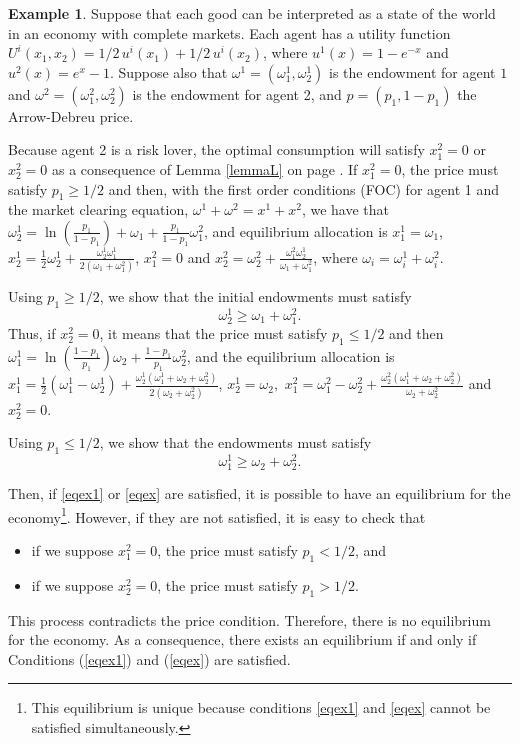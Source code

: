 \documentclass[pdftex]{article}
\numberwithin{equation}{section}
\theoremstyle{th}
\newtheorem{proof lemma}{{Proof Lemma}.}
\theoremstyle{definition}
\newtheorem{example}{Example}%
\newtheorem*{risk lovers}{Risk lovers}
\newtheorem*{risk averse}{Risk averse}
\begin{document}
\begin{example}
\label{ex-1}
Suppose that each good can be interpreted as a state of the world in an economy with complete markets. Each agent has a utility function $U^i\left(x_1,x_2\right)=1/2\,u^i\left(x_1\right)+1/2\,u^i(x_2)$, where $u^1(x)=1-e^{-x}$ and $u^2(x)=e^x-1$. Suppose also that $\omega^1=\left(\omega^1_1,\omega_2^1\right)$ is the endowment for agent $1$ and $\omega^2=\left(\omega^2_1,\omega^2_2\right)$ is the endowment for agent 2, and $p=(p_1,1-p_1)$ the Arrow-Debreu price.

Because agent 2 is a risk lover, the optimal consumption will satisfy $x^2_1=0$ or $x^2_2=0$ as a consequence of Lemma \ref{lemmaL} on page \pageref{lemmaL}. %
If $x^2_1=0$, the price must satisfy $p_1\geq1/2$ and then, with the first order conditions (FOC) for agent 1 and the market clearing equation, $\omega^1+\omega^2=x^1+x^2$, we have that $\omega_2^1=\ln\left(\frac{p_1}{1-p_1}\right)+\omega_1+\frac{p_1}{1-p_1}\omega_1^2$, and equilibrium allocation is $x^1_1=\omega_1$, $x^1_2=\frac{1}{2}\omega^1_2+\frac{\omega_2^1\omega_1^1}{2\left(\omega_1+\omega_1^2\right)}$, $x^2_1=0$ and $x^2_2=\omega_2^2+\frac{\omega_1^2\omega^1_2}{\omega_1+\omega_1^2}$, where $\omega_i=\omega^1_i+\omega^2_i.$


Using $p_1\geq1/2$, we show that the initial endowments must satisfy\begin{equation}\label{eqex1}\omega_2^1\geq\omega_1+\omega^2_1.\end{equation}
Thus, if $x^2_2=0$, it means that the price must satisfy $p_1\leq1/2$ and then $\omega^1_1=\ln\left(\frac{1-p_1}{p_1}\right)\omega_2+\frac{1-p_1}{p_1}\omega_2^2$, and the equilibrium allocation is $x^1_1=\frac{1}{2}\left(\omega^1_1-\omega_2^1\right)+\frac{\omega_2^1\left(\omega_1^1+\omega_2+\omega_2^2\right)}{2\left(\omega_2+\omega_2^2\right)}$, $x^1_2=\omega_2,$ 
 $x^2_1=\omega_1^2-\omega_2^2+\frac{\omega_2^2\left(\omega_1^1+\omega_2+\omega_2^2\right)}{\omega_2+\omega_2^2}$ and $x^2_2=0$.

Using $p_1\leq1/2$, we show that the endowments must satisfy\begin{equation}\label{eqex}
\omega_1^1\geq\omega_2+\omega^2_2.\end{equation}

Then, if \ref{eqex1} or \ref{eqex} are satisfied, it is possible to have an equilibrium for the economy\footnote{This equilibrium is unique because conditions \ref{eqex1} and \ref{eqex} cannot be satisfied simultaneously.}. However, if they are not satisfied, it is easy to check that \begin{itemize}\item if we suppose $x^2_1=0$, the price must satisfy $p_1<1/2$, and \item if we suppose $x^2_2=0$, the price must satisfy $p_1>1/2$.\end{itemize}
This process contradicts the price condition. Therefore, there is no equilibrium for the economy. As a consequence, there exists an equilibrium if and only if Conditions (\ref{eqex1}) and (\ref{eqex}) are satisfied.


\end{example}
\end{document}
